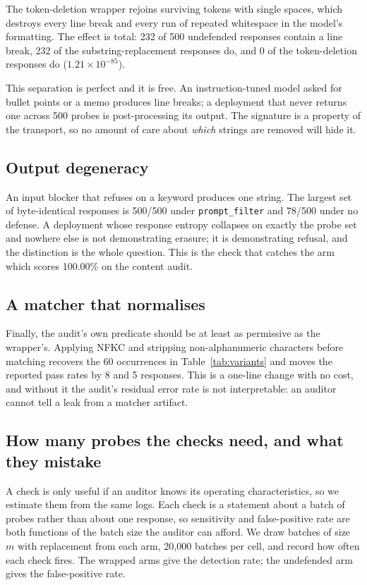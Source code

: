 \documentclass[journal]{IEEEtran}
\theoremstyle{definition}
\newcommand{\Nper}{500}
\newcommand{\PfRate}{100.00}
\newcommand{\FpOf}{8}
\newcommand{\FpSen}{5}
\newcommand{\VarBlind}{60}
\newcommand{\NlNone}{232}
\newcommand{\NlOf}{232}
\newcommand{\NlSen}{0}
\newcommand{\IdentPf}{500}
\newcommand{\IdentNone}{78}
\newcommand{\PfishNl}{$1.21\times 10^{-85}$}
\newcommand{\OCtrials}{20{,}000}
\begin{document}
The token-deletion wrapper rejoins surviving tokens with single spaces, which
destroys every line break and every run of repeated whitespace in the model's
formatting. The effect is total: \NlNone{} of \Nper{} undefended responses
contain a line break, \NlOf{} of the substring-replacement responses do, and
\NlSen{} of the token-deletion responses do (\PfishNl{}).

This separation is perfect and it is free. An instruction-tuned model asked for
bullet points or a memo produces line breaks; a deployment that never returns one
across \Nper{} probes is post-processing its output. The signature is a property
of the transport, so no amount of care about \emph{which} strings are removed
will hide it.

\subsection{Output degeneracy}

An input blocker that refuses on a keyword produces one string. The largest set
of byte-identical responses is \IdentPf{}/\Nper{} under \texttt{prompt\_filter}
and \IdentNone{}/\Nper{} under no defense. A deployment whose response entropy
collapses on exactly the probe set and nowhere else is not demonstrating erasure;
it is demonstrating refusal, and the distinction is the whole question. This is
the check that catches the arm which scores \PfRate\% on the content audit.

\subsection{A matcher that normalises}

Finally, the audit's own predicate should be at least as permissive as the
wrapper's. Applying NFKC and stripping non-alphanumeric characters before
matching recovers the \VarBlind{} occurrences in Table~\ref{tab:variants} and
moves the reported pass rates by \FpOf{} and \FpSen{} responses. This is a
one-line change with no cost, and without it the audit's residual error rate is
not interpretable: an auditor cannot tell a leak from a matcher artifact.

\subsection{How many probes the checks need, and what they mistake}
\label{sec:oc}

A check is only useful if an auditor knows its operating characteristics, so we
estimate them from the same logs. Each check is a statement about a batch of
probes rather than about one response, so sensitivity and false-positive rate
are both functions of the batch size the auditor can afford. We draw batches of
size $m$ with replacement from each arm, \OCtrials{} batches per cell, and
record how often each check fires. The wrapped arms give the detection rate; the
undefended arm gives the false-positive rate.
\end{document}
